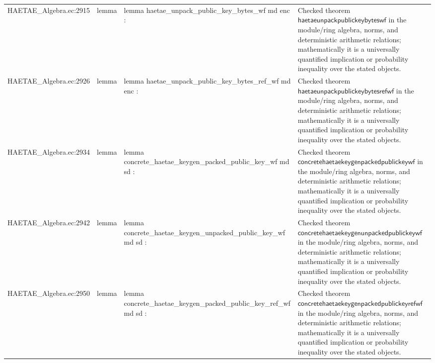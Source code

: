 \documentclass[10pt]{article}
\begin{document}
\begin{longtable}{L{0.11\textwidth}L{0.055\textwidth}L{0.385\textwidth}L{0.41\textwidth}}
HAETAE\_\allowbreak{}Algebra.\allowbreak{}ec:\allowbreak{}2915 & lemma & {\ttfamily\scriptsize lemma haetae\_\allowbreak{}unpack\_\allowbreak{}public\_\allowbreak{}key\_\allowbreak{}bytes\_\allowbreak{}wf md enc :} & Checked theorem $\mathsf{haetaeunpackpublickeybyteswf}$ in the module/ring algebra, norms, and deterministic arithmetic relations; mathematically it is a universally quantified implication or probability inequality over the stated objects. \\
HAETAE\_\allowbreak{}Algebra.\allowbreak{}ec:\allowbreak{}2926 & lemma & {\ttfamily\scriptsize lemma haetae\_\allowbreak{}unpack\_\allowbreak{}public\_\allowbreak{}key\_\allowbreak{}bytes\_\allowbreak{}ref\_\allowbreak{}wf md enc :} & Checked theorem $\mathsf{haetaeunpackpublickeybytesrefwf}$ in the module/ring algebra, norms, and deterministic arithmetic relations; mathematically it is a universally quantified implication or probability inequality over the stated objects. \\
HAETAE\_\allowbreak{}Algebra.\allowbreak{}ec:\allowbreak{}2934 & lemma & {\ttfamily\scriptsize lemma concrete\_\allowbreak{}haetae\_\allowbreak{}keygen\_\allowbreak{}packed\_\allowbreak{}public\_\allowbreak{}key\_\allowbreak{}wf md sd :} & Checked theorem $\mathsf{concretehaetaekeygenpackedpublickeywf}$ in the module/ring algebra, norms, and deterministic arithmetic relations; mathematically it is a universally quantified implication or probability inequality over the stated objects. \\
HAETAE\_\allowbreak{}Algebra.\allowbreak{}ec:\allowbreak{}2942 & lemma & {\ttfamily\scriptsize lemma concrete\_\allowbreak{}haetae\_\allowbreak{}keygen\_\allowbreak{}unpacked\_\allowbreak{}public\_\allowbreak{}key\_\allowbreak{}wf md sd :} & Checked theorem $\mathsf{concretehaetaekeygenunpackedpublickeywf}$ in the module/ring algebra, norms, and deterministic arithmetic relations; mathematically it is a universally quantified implication or probability inequality over the stated objects. \\
HAETAE\_\allowbreak{}Algebra.\allowbreak{}ec:\allowbreak{}2950 & lemma & {\ttfamily\scriptsize lemma concrete\_\allowbreak{}haetae\_\allowbreak{}keygen\_\allowbreak{}packed\_\allowbreak{}public\_\allowbreak{}key\_\allowbreak{}ref\_\allowbreak{}wf md sd :} & Checked theorem $\mathsf{concretehaetaekeygenpackedpublickeyrefwf}$ in the module/ring algebra, norms, and deterministic arithmetic relations; mathematically it is a universally quantified implication or probability inequality over the stated objects. \\

\end{longtable}
\end{document}
